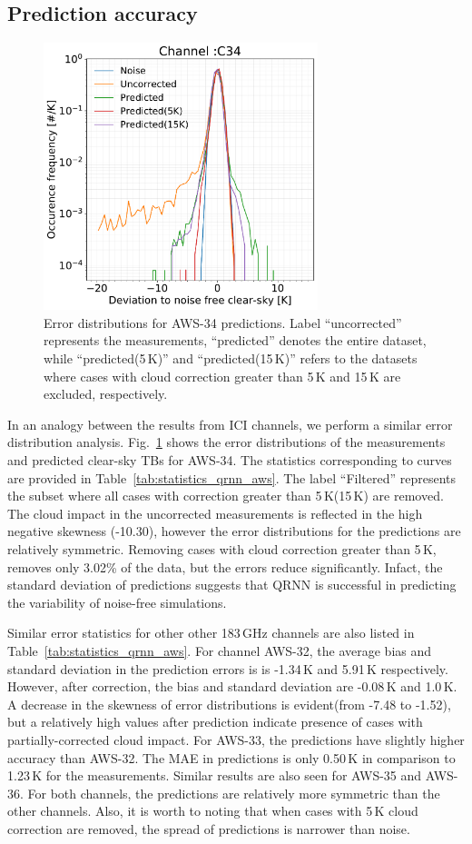 \documentclass[amt, manuscript]{copernicus}
\begin{document}
\subsection{Prediction accuracy}
\begin{figure}[t]
	\includegraphics[width = 80mm]{Figures/AWS-34_single.pdf}	
	\caption{Error distributions for AWS-34 predictions. Label ``uncorrected'' represents the measurements, ``predicted'' denotes the entire dataset, while ``predicted(5\,K)'' and  ``predicted(15\,K)''  refers to the datasets where cases with cloud correction greater than 5\,K and 15\,K are excluded, respectively.}
	\label{fig:qrnn_C34_deviations}	
\end{figure}
In an analogy between the results from ICI channels, we perform a similar error distribution analysis. Fig.~\ref{fig:qrnn_C34_deviations} shows the error distributions of the measurements and predicted clear-sky TBs for AWS-34. The statistics corresponding to curves are provided in Table~\ref{tab:statistics_qrnn_aws}. The label ``Filtered'' represents the subset where all cases with correction greater than 5\,K(15\,K) are removed. The cloud impact in the uncorrected measurements is reflected in the high negative skewness (-10.30), however the  error distributions for the predictions are relatively symmetric. Removing cases with cloud correction greater than 5\,K, removes only 3.02\% of the data, but the errors reduce significantly. Infact, the standard deviation of predictions suggests that QRNN is successful in predicting the variability of noise-free simulations. 

Similar error statistics for other other 183\,GHz channels are also listed in Table~\ref{tab:statistics_qrnn_aws}. For channel AWS-32, the average bias and standard deviation in the prediction errors is is -1.34\,K and 5.91\,K respectively. However, after correction, the bias and standard deviation are -0.08\,K and 1.0\,K. A decrease in the skewness of error distributions is evident(from -7.48 to -1.52), but a relatively high values after prediction indicate presence of cases with partially-corrected cloud impact. For AWS-33, the predictions have slightly higher accuracy than AWS-32. The MAE in predictions is only 0.50\,K in comparison to 1.23\,K for the measurements. Similar results are also seen for AWS-35 and AWS-36. For both channels, the predictions are relatively more symmetric than the other channels. Also, it is worth to noting that when cases with 5\,K cloud correction are removed, the spread of predictions is narrower than noise. 
\end{document}
